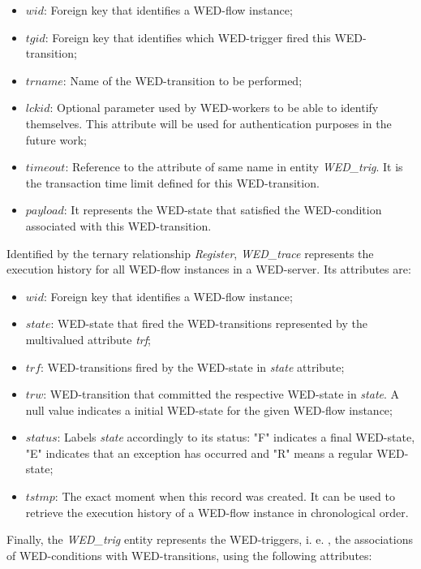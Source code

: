 \documentclass[12pt]{article}
\begin{document}
\begin{itemize}
\item $wid$: Foreign key that identifies a WED-flow instance;
\item $tgid$: Foreign key that identifies which WED-trigger fired this WED-transition;
\item $trname$: Name of the WED-transition to be performed;
\item $lckid$: Optional parameter used by WED-workers to be able to identify themselves. This attribute will be used for authentication purposes in the future work;  
\item $timeout$: Reference to the attribute of same name in entity \emph{WED\_trig}. It is the transaction time limit defined for this WED-transition.  
\item $payload$: It represents the WED-state that satisfied the WED-condition associated with this WED-transition. 
\end{itemize}

Identified by the ternary relationship \emph{Register}, \emph{WED\_trace} represents the execution history for all WED-flow instances in a WED-server. Its attributes are:

\begin{itemize}  
\item $wid$: Foreign key that identifies a WED-flow instance;
\item $state$: WED-state that fired the WED-transitions represented by the multivalued attribute \emph{trf};  
\item $trf$: WED-transitions fired by the WED-state in \emph{state} attribute;
\item $trw$: WED-transition that committed the respective WED-state in \emph{state}. A null value indicates a initial WED-state for the given WED-flow instance;
\item $status$: Labels \emph{state} accordingly to its status: "F" indicates  a final WED-state, "E" indicates that an exception has occurred and "R" means a regular WED-state;
\item $tstmp$: The exact moment when this record was created. It can be used to retrieve the execution history of a WED-flow instance in chronological order. 
\end{itemize}

Finally, the \emph{WED\_trig} entity represents the WED-triggers, i. e. , the associations of WED-conditions with WED-transitions, using the following attributes:
\end{document}
